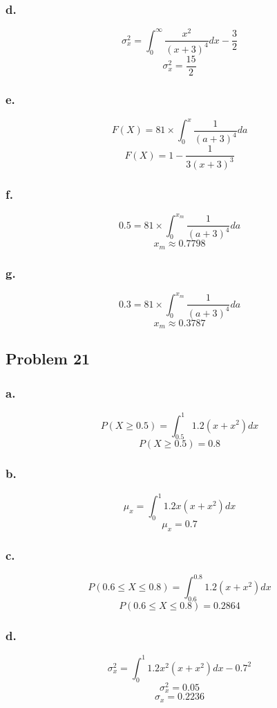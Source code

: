 \documentclass[11pt]{article}
\begin{document}
\subsubsection*{d.}
\[ \sigma_x^2 = \int_{0}^{\infty} \frac{x^2}{{(x+3)}^4} dx - \frac{3}{2} \]
\[ \sigma_x^2 = \frac{15}{2} \]


\subsubsection*{e.}
\[ F(X) = 81 \times \int_{0}^{x} \frac{1}{{(a+3)}^4} da \]
\[ F(X) = 1 - \frac{1}{3(x+3)^3} \]

\subsubsection*{f.}
\[ 0.5 = 81 \times \int_{0}^{x_m} \frac{1}{{(a+3)}^4} da \]
\[ x_m \approx 0.7798 \]

\subsubsection*{g.}
\[ 0.3 = 81 \times \int_{0}^{x_m} \frac{1}{{(a+3)}^4} da \]
\[ x_m \approx 0.3787 \]

\subsection*{Problem 21}
\subsubsection*{a.}
\[ P(X\ge0.5) = \int_{0.5}^{1} 1.2(x+x^2) dx \]
\[ P(X\ge0.5) = 0.8 \]
\subsubsection*{b.}
\[ \mu_x = \int_{0}^{1} 1.2x(x+x^2) dx \]
\[ \mu_x = 0.7 \]

\subsubsection*{c.}
\[ P(0.6\le X\le0.8) = \int_{0.6}^{0.8} 1.2(x+x^2) dx \]
\[ P(0.6\le X\le0.8) = 0.2864 \]

\subsubsection*{d.}
\[ \sigma_x^2 = \int_{0}^{1} 1.2x^2(x+x^2) dx - 0.7^2 \]
\[ \sigma_x^2 = 0.05 \]
\[ \sigma_x = 0.2236 \]
\end{document}
